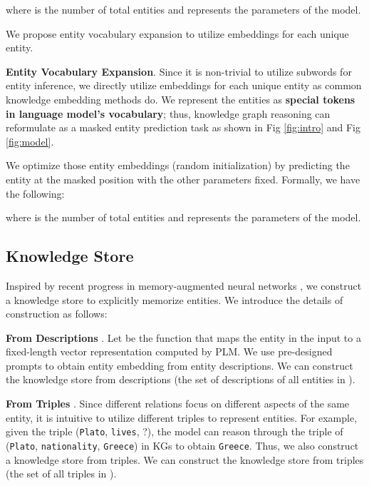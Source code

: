 \documentclass[runningheads]{llncs}
\begin{document}
where  is the number of total entities  and  represents the parameters of the model.

We propose entity vocabulary expansion to utilize embeddings for each unique entity. 


\textbf{Entity Vocabulary Expansion}.
\label{sec:semantic-aware entity modeling}
Since it is non-trivial to utilize subwords for entity inference, we directly utilize embeddings for each unique entity as common knowledge embedding methods \cite{Bordes:TransE} do.
We represent the entities  as \textbf{special tokens in language model's vocabulary}; thus, knowledge graph reasoning can reformulate as a masked entity prediction task as shown in Fig \ref{fig:intro} and Fig \ref{fig:model}.








We optimize those entity embeddings (random initialization) by predicting the entity  at the masked position with the other parameters fixed. 
Formally, we have the following:

where  is the number of total entities  and  represents the parameters of the model.

\subsection{Knowledge Store}\label{sec:knowledge store}

Inspired by recent progress in memory-augmented neural networks \cite{DBLP:conf/iclr/KhandelwalLJZL20,DBLP:conf/emnlp/KassnerS20}, we construct a knowledge store to explicitly memorize entities. 
We introduce the details  of construction as follows:




\textbf{From Descriptions }.
Let  be the function that maps the entity  in the input  to a fixed-length vector representation computed by PLM.
We use pre-designed prompts to obtain entity embedding from entity descriptions.
We can construct the knowledge store  from descriptions (the set of descriptions  of all entities  in ).


\textbf{From Triples }.
Since different relations focus on different aspects of the same entity, it is intuitive to utilize different triples to represent entities. 
For example, given the triple (\texttt{Plato}, \texttt{lives}, ?), the model can reason through the triple of (\texttt{Plato}, \texttt{nationality}, \texttt{Greece}) in KGs to obtain \texttt{Greece}.
Thus, we also construct a knowledge store from triples. 
We can construct the knowledge store  from triples (the set of all triples  in ).
\end{document}
